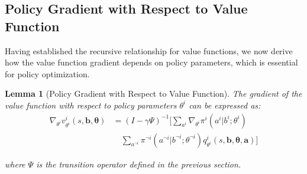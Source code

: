 \documentclass[a4paper,12pt]{report}
\newtheorem{lemma}{Lemma}
\begin{document}
\subsection{Policy Gradient with Respect to Value Function}
Having established the recursive relationship for value functions, we now derive
how the value function gradient depends on policy parameters, which is essential
for policy optimization.
\begin{lemma}[Policy Gradient with Respect to Value Function]
    The gradient of the value function with respect to policy parameters $\theta^{i}$
    can be expressed as:
    \begin{align}
        \nabla_{\theta^i}v^{i}_{\theta^i}(s, \boldsymbol{b}, \boldsymbol{\theta}) & = (I - \gamma \Psi)^{-1}\Bigg[\sum_{a^i}\nabla_{\theta^i}\pi^{i}(a^{i}|b^{i}; \theta^{i}) \nonumber                                                        \\
                                                                                  & \quad \sum_{a^{\neg i}}\pi^{\neg i}(a^{\neg i}|b^{\neg i}; \theta^{\neg i}) q^{i}_{\theta^i}(s, \boldsymbol{b}, \boldsymbol{\theta}, \boldsymbol{a})\Bigg]
    \end{align}

    where $\Psi$ is the transition operator defined in the previous section.
\end{lemma}
\end{document}

